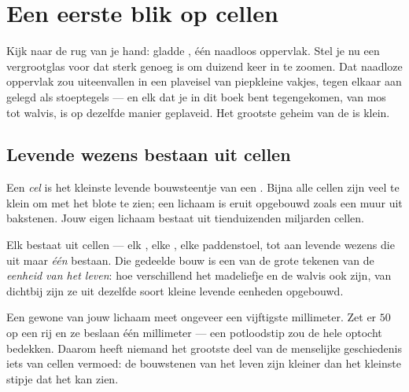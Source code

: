 \chapter{Een eerste blik op cellen}\label{ch:g5:first-look-at-cells}

Kijk naar de rug van je hand: gladde , één naadloos oppervlak. Stel
je nu een vergrootglas voor dat sterk genoeg is om duizend keer in te
zoomen. Dat naadloze oppervlak zou uiteenvallen in een plaveisel van
piepkleine vakjes, tegen elkaar aan gelegd als stoeptegels --- en elk
 dat je in dit boek bent tegengekomen, van mos tot walvis,
is op dezelfde manier geplaveid. Het grootste geheim van de  is klein.

\section{Levende wezens bestaan uit cellen}

\begin{definition}[Cel]\label{def:g5:first-look-at-cells:cell}
Een \emph{cel} is het kleinste levende bouwsteentje van een
. Bijna alle cellen zijn veel te klein om met het blote 
te zien; een lichaam is eruit opgebouwd zoals een muur uit bakstenen.
Jouw eigen lichaam bestaat uit tienduizenden miljarden cellen.
\end{definition}

\begin{proposition}\label{prop:g5:first-look-at-cells:principle}
Elk  bestaat uit cellen --- elk , elke , elke
paddenstoel, tot aan levende wezens die uit maar \emph{één}  bestaan.
Die gedeelde bouw is een van de grote tekenen van de \emph{eenheid van
het leven}: hoe verschillend het madeliefje
en de walvis ook zijn, van dichtbij zijn ze uit dezelfde soort kleine
levende eenheden opgebouwd.
\end{proposition}
\admitted

\begin{example}\label{ex:g5:first-look-at-cells:small}
Een gewone  van jouw lichaam meet ongeveer een vijftigste
millimeter. Zet er $50$ op een rij en ze beslaan één millimeter --- een
potloodstip zou de hele optocht bedekken. Daarom heeft niemand het
grootste deel van de menselijke geschiedenis iets van cellen vermoed: de
bouwstenen van het leven zijn kleiner dan het kleinste stipje dat het
 kan zien.
\end{example}

